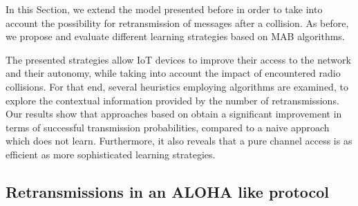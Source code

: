 
\graphicspath{{2-Chapters/4-Chapter/IEEE_WCNC__2019__Paper__BMBM.git/}}

In this Section, we extend the model presented before in order to take into account the possibility for retransmission of messages after a collision.
As before, we propose and evaluate different learning strategies based on MAB algorithms.

The presented strategies allow IoT devices to improve their access to the network and their autonomy, while taking into account the impact of encountered radio collisions.
For that end, several heuristics employing \UCB{} algorithms are examined, to explore the contextual information provided by the number of retransmissions.
Our results show that approaches based on \UCB{} obtain a significant improvement in terms of successful transmission probabilities, compared to a naive approach which does not learn.
Furthermore, it also reveals that a pure \UCB{} channel access is as efficient as more sophisticated learning strategies.






\subsection{Retransmissions in an ALOHA like protocol}
\label{sub:43:introduction}

